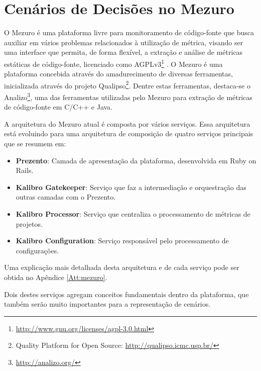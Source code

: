 \section{Cenários de Decisões no Mezuro}
\label{mezuro-cenarios}

O Mezuro é uma plataforma livre para monitoramento de código-fonte que busca auxiliar em vários problemas relacionados à utilização de métrica, visando ser uma interface que permita, de forma flexível, a extração e análise de métricas estáticas de código-fonte, licenciado como AGPLv3\footnote{\url{http://www.gnu.org/licenses/agpl-3.0.html}} \cite{manzo2014}. O Mezuro é uma plataforma concebida através do amadurecimento de diversas ferramentas, inicializada através do projeto Qualipso\footnote{Quality Platform for Open Source: \url{http://qualipso.icmc.usp.br/}}. Dentre estas ferramentas, destaca-se o Analizo\footnote{\url{http://analizo.org/}}, uma das ferramentas utilizadas pelo Mezuro para extração de métricas de código-fonte em C/C++ e Java.

A arquitetura do Mezuro atual é composta por vários serviços. Essa arquitetura está evoluindo para uma arquitetura de composição de quatro serviços principais que se resumem em:

\begin{itemize}
\item \textbf{Prezento}: Camada de apresentação da plataforma, desenvolvida em Ruby on Rails.

\item \textbf{Kalibro Gatekeeper}: Serviço que faz a intermediação e orquestração das outras camadas com o Prezento.

\item \textbf{Kalibro Processor}: Serviço que centraliza o processamento de métricas de projetos.

\item \textbf{Kalibro Configuration}: Serviço responsável pelo processamento de configurações.
\end{itemize}

Uma explicação mais detalhada desta arquitetura e de cada serviço pode ser obtida no Apêndice \ref{Att:mezuro}.

Dois destes serviços agregam conceitos fundamentais dentro da plataforma, que também serão muito importantes para a representação de cenários. 

